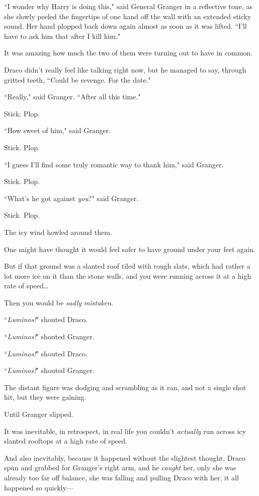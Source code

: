 ``I wonder why Harry is doing this," said General Granger in a reflective tone, as she slowly peeled the fingertips of one hand off the wall with an extended sticky sound. Her hand plopped back down again almost as soon as it was lifted. ``I'll have to ask him that after I kill him."

It was amazing how much the two of them were turning out to have in common.

Draco didn't really feel like talking right now, but he managed to say, through gritted teeth, ``Could be revenge. For the date."

``Really," said Granger. ``After all this time."

Stick. Plop.

``How sweet of him," said Granger.

Stick. Plop.

``I guess I'll find some truly romantic way to thank him," said Granger.

Stick. Plop.

``What's he got against \emph{you}?" said Granger.

Stick. Plop.

The icy wind howled around them.

\later

One might have thought it would feel safer to have ground under your feet again.

But if that ground was a slanted roof tiled with rough slats, which had rather a lot more ice on it than the stone walls, and you were running across it at a high rate of speed{\ldots}

Then you would be \emph{sadly mistaken}.

``\emph{Luminos!}" shouted Draco.

``\emph{Luminos!}" shouted Granger.

``\emph{Luminos!}" shouted Draco.

``\emph{Luminos!}" shouted Granger.

The distant figure was dodging and scrambling as it ran, and not a single shot hit, but they were gaining.

Until Granger slipped.

It was inevitable, in retrospect, in real life you couldn't \emph{actually} run across icy slanted rooftops at a high rate of speed.

And also inevitably, because it happened without the slightest thought, Draco spun and grabbed for Granger's right arm, and he \emph{caught} her, only she was already too far off balance, she was falling and pulling Draco with her, it all happened so quickly---

